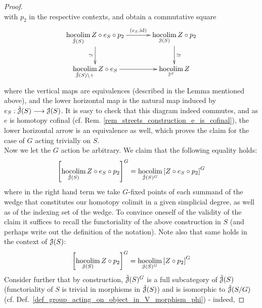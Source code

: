\begin{lem}
\begin{proof}
\begin{displaymath}
      \end{displaymath}
      with $p_2$ in the respective contexts, and obtain a commutative square
      \begin{displaymath}
        \xymatrix@C+1em{
          \hocolim\limits_{\tilde{\cJ}(S)} Z \circ e_S \circ p_2
            \ar[r]^-{(e_S, \id)}
            \ar[d]_-{\simeq}
          &
          \hocolim\limits_{\cJ(S)} Z \circ p_2
            \ar[d]^-{\simeq}
          \\
          \hocolim\limits_{\tilde{\cJ}(S) \setminus {+}} Z \circ e_S
            \ar[r]
          &
          \hocolim\limits_{\cI^S} Z
        }
      \end{displaymath}
      where the vertical maps are equivalences (described in the Lemma
      mentioned above), and the lower horizontal map is the natural map induced
      by $e_S: \tilde{\mathcal{J}}(S) \longrightarrow \mathcal{J}(S)$. It is easy to check that this
      diagram indeed commutes, and as $e$ is homotopy cofinal (cf. Rem.
      \ref{rem_streets_construction_e_is_cofinal}), the lower horizontal arrow
      is an equivalence as well, which proves the claim for the case of $G$
      acting trivially on $S$.\\
      Now we let the $G$ action be arbitrary. We claim that the following
      equality holds:
      \begin{displaymath}
        \left[ \hocolim_{\tilde{\cJ}(S)} Z \circ e_S \circ p_2 \right]^G = %
        \hocolim_{\tilde{\cJ}(S)^G} \left[ Z \circ e_S \circ p_2 \right]^G
      \end{displaymath}
      where in the right hand term we take $G$-fixed points of each summand
      of the wedge that constitutes our homotopy colimit in a given simplicial
      degree, as well as of the indexing set of the wedge. To convince oneself
      of the validity of the claim it suffices to recall the functoriality of
      the above construction in $S$ (and perhaps write out the definition of the
      notation). Note also that same holds in the context of $\mathcal{J}(S)$:
      \begin{displaymath}
        \left[ \hocolim_{\cJ(S)} Z \circ p_2 \right]^G = %
        \hocolim_{\cJ(S)^G} \left[ Z \circ p_2 \right]^G
      \end{displaymath}
      Consider further that by construction, $\tilde{\mathcal{J}}(S)^G$ is a full
      subcategory of $\tilde{\mathcal{J}}(S)$ (functoriality of $S$ is trivial in
      morphisms in $\tilde{\mathcal{J}}(S)$) and is isomorphic to $\tilde{\mathcal{J}}(S/G)$
      (cf.  Def.~\ref{def_group_acting_on_object_in_V_morphism_phi}) - indeed,

\end{proof}
\end{lem}
